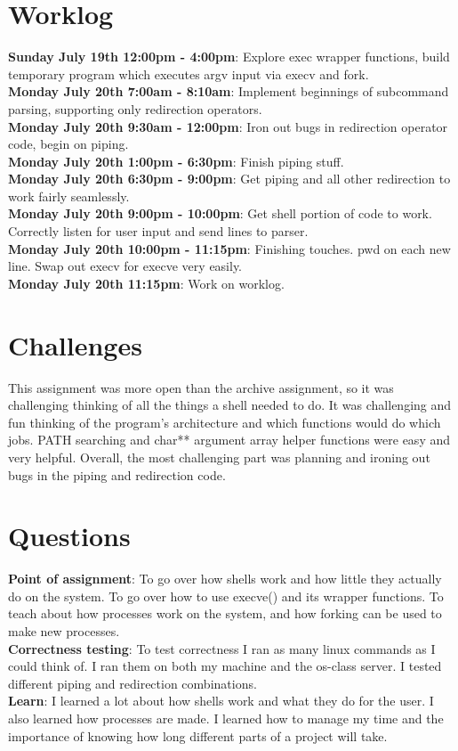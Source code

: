 \documentclass[11pt]{article}
\begin{document}
\section{Worklog}
\textbf{Sunday July 19th 12:00pm - 4:00pm}: Explore exec wrapper functions, build temporary program which executes argv input via execv and fork. \\
\textbf{Monday July 20th 7:00am - 8:10am}: Implement beginnings of subcommand parsing, supporting only redirection operators. \\
\textbf{Monday July 20th 9:30am - 12:00pm}: Iron out bugs in redirection operator code, begin on piping. \\
\textbf{Monday July 20th 1:00pm - 6:30pm}: Finish piping stuff. \\
\textbf{Monday July 20th 6:30pm - 9:00pm}: Get piping and all other redirection to work fairly seamlessly. \\
\textbf{Monday July 20th 9:00pm - 10:00pm}: Get shell portion of code to work. Correctly listen for user input and send lines to parser. \\
\textbf{Monday July 20th 10:00pm - 11:15pm}: Finishing touches. pwd on each new line. Swap out execv for execve very easily. \\
\textbf{Monday July 20th 11:15pm}: Work on worklog. \\

\section{Challenges}
This assignment was more open than the archive assignment, so it was challenging thinking of all the things a shell needed to do. It was challenging and fun
thinking of the program's architecture and which functions would do which jobs. PATH searching and char** argument array helper functions were easy and very helpful. 
Overall, the most challenging part was planning and ironing out bugs in the piping and redirection code. \\

\section{Questions}
\textbf{Point of assignment}: To go over how shells work and how little they actually do on the system. To go over how to use execve() and its wrapper functions. To 
teach about how processes work on the system, and how forking can be used to make new processes. \\

\textbf{Correctness testing}: To test correctness I ran as many linux commands as I could think of. I ran them on both my machine and the os-class server. I tested
different piping and redirection combinations. \\

\textbf{Learn}: I learned a lot about how shells work and what they do for the user. I also learned how processes are made. I learned how to manage my time and the
importance of knowing how long different parts of a project will take. \\
\end{document}
